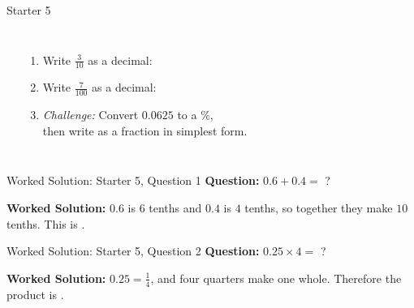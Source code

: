 \documentclass{beamer}
\newcommand{\ablank}[1]{%
  \alt<2>{\textcolor{red}{#1}}{\underline{\phantom{#1}}}%
}
\newcommand{\ashow}[1]{\uncover<2->{\textcolor{red}{\small #1}}}
\begin{document}
\begin{frame}[t]{Starter 5}
\begin{columns}
\begin{center}
\end{center}

\begin{enumerate}
  \item Write $\frac{3}{10}$ as a decimal: \ablank{$0.3$}
  \item Write $\frac{7}{100}$ as a decimal: \ablank{$0.07$}
  \item \textit{Challenge:} Convert $0.0625$ to a \%,\\
        then write as a fraction in simplest form.
        \ashow{$6.25\%=\tfrac{1}{16}$}
\end{enumerate}
\end{columns}
\end{frame}

\begin{frame}[t]{Worked Solution: Starter 5, Question 1}
\hypertarget{work-st5}{}
\textbf{Question:} \(0.6 + 0.4 =\) ?

\smallskip
\textbf{Worked Solution:} \(0.6\) is \(6\) tenths and \(0.4\) is \(4\) tenths, so together they make \(10\) tenths. This is \ablank{$1$}.
\end{frame}

\begin{frame}[t]{Worked Solution: Starter 5, Question 2}
\textbf{Question:} \(0.25 \times 4 =\) ?

\smallskip
\textbf{Worked Solution:} \(0.25 = \frac{1}{4}\), and four quarters make one whole. Therefore the product is \ablank{$1$}.
\end{frame}
\end{document}
